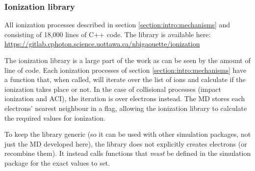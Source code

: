 \subsubsection{Ionization library}
\label{section:tools:libraries:ionization}

All ionization processes described in section
\ref{section:intro:mechanisms} and consisting of 18,000 lines of C++ code.
The library is available here:
\url{https://gitlab.cphoton.science.uottawa.ca/nbigaouette/ionization}

The ionization library is a large part of the work as can be seen by the amount
of line of code. Each ionization processes of section
\ref{section:intro:mechanisms} have a function that, when called, will iterate
over the list of ions and calculate if the ionization takes place or not. In the
case of collisional processes (impact ionization and ACI), the iteration is over
electrons instead. The MD stores each electrons' nearest neighbour in a flag,
allowing the ionization library to calculate the required values for ionization.

To keep the library generic (so it can be used with other simulation packages,
not just the MD developed here), the library does not explicitly creates
electrons (or recombine them). It instead calls functions that \textit{must}
be defined in the simulation package for the exact values to set.


